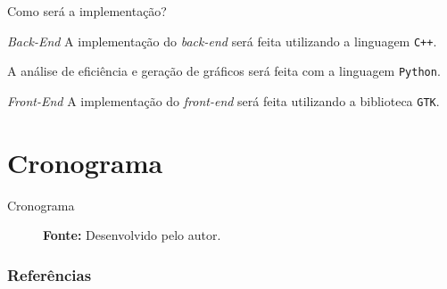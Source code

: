 \documentclass{beamer}
\begin{document}
    \begin{frame}{Como será a implementação?}

        \begin{block}{\textit{Back-End}}
            A implementação do \textit{back-end} será feita utilizando a linguagem \texttt{C++}.

            A análise de eficiência e geração de gráficos será feita com a linguagem \texttt{Python}.
        \end{block}
        \begin{block}{\textit{Front-End}}
            A implementação do \textit{front-end} será feita utilizando a biblioteca \texttt{GTK}.
        \end{block}
    \end{frame}
    \section{Cronograma}
    \begin{frame}{Cronograma}
        \begin{figure}
            \caption{\textbf{Fonte:} Desenvolvido pelo autor.}
        \end{figure}
    \end{frame}

    \begin{frame}
        \frametitle{Referências}
        \printbibliography
    \end{frame}
\end{document}
